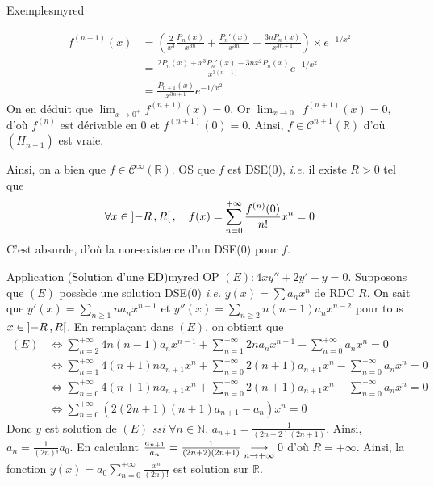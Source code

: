 \begin{omed}{Exemples}{myred}
\begin{enumerate}[label=\textcolor{myred}{\alph*.}]
\begin{itemize}
\begin{align*}
                    f^{(n+1)}(x) 
                    &= \left(\frac{2}{x^3} \frac{P_n(x)}{x^{3n}} + \frac{P_n'(x)}{x^{3n}} - \frac{3n P_n(x)}{x^{3n + 1}}\right)\times e^{-1/x^2} \\
                    &= \frac{2 P_n(x) + x^3 P_n'(x) - 3n x^2 P_n(x)}{x^{3(n+1)}} e^{-1/x^2} \\
                    &= \frac{P_{n+1}(x)}{x^{3n+1}} e^{-1/x^2}
                \end{align*}
                On en déduit que $\lim_{x \to 0^+} f^{(n+1)}(x) = 0$. Or $\lim_{x \to 0^-} f^{(n+1)}(x) = 0$, d’où $f^{(n)}$ est dérivable en $0$ et $f^{(n+1)}(0) = 0$. Ainsi, $f \in \mathcal{C}^{n+1}(\mathbb{R})$ d’où $(H_{n+1})$ est vraie.
            \end{itemize}
            Ainsi, on a bien que $f \in \mathcal{C}^{\infty}(\mathbb{R})$. OS que $f$ est DSE(0), \textit{i.e.} il existe $R > 0$ tel que 
            \[ \forall x \in \left] -R \, , R \right[, \quad f(x) = \sum_{n=0}^{+\infty} \frac{f^{(n)}(0)}{n!} x^n = 0 \]   
            C’est absurde, d’où la non-existence d’un DSE(0) pour $f$.
        \end{enumerate}
    \end{omed}

    \begin{omed}{Application (\textcolor{black}{Solution d’une ED})}{myred}
        OP $(E) : 4x y'' + 2 y' - y = 0$. Supposons que $(E)$ possède une solution DSE(0) \textit{i.e.} $y(x) = \sum a_n x^n$ de RDC $R$. On sait que $y'(x) = \sum_{n \geq 1} n a_n x^{n-1}$ et $y''(x) = \sum_{n \geq 2} n(n-1) a_n x^{n-2}$ pour tous $x \in \left] -R \, , R \right[$. En remplaçant dans $(E)$, on obtient que 
        \begin{align*}
            (E) 
            & \iff \sum_{n=2}^{+\infty} 4n(n-1) a_n x^{n-1} + \sum_{n=1}^{+\infty} 2 n a_n x^{n-1}  - \sum_{n=0}^{+\infty} a_n x^n = 0 \\
            & \iff \sum_{n=1}^{+\infty} 4 (n+1) n a_{n+1} x^n + \sum_{n=0}^{+\infty} 2 (n+1) a_{n+1} x^n - \sum_{n=0}^{+\infty} a_n x^n = 0 \\
            & \iff \sum_{n = 0}^{+\infty } 4 (n+1) n a_{n+1} x^n + \sum_{n=0}^{+\infty} 2 (n+1) a_{n+1} x^n - \sum_{n=0}^{+\infty} a_n x^n = 0 \\
            & \iff \sum_{n=0}^{+\infty} \left(2(2n+1)(n+1) a_{n+1} - a_n\right)x^n = 0 
        \end{align*}
        Donc $y$ est solution de $(E)$ \textit{ssi} $\forall n \in \mathbb{N}$, $a_{n+1} = \frac{1}{(2n+2)(2n+1)}$. Ainsi, $a_n = \frac{1}{(2n)!} a_0$. En calculant $\frac{a_{n+1}}{a_n} = \frac{1}{(2n+2)(2n+1)} \underset{n \rightarrow +\infty}{\longrightarrow} 0$ d’où $R = +\infty$. Ainsi, la fonction $y(x) = a_0 \sum_{n=0}^{+\infty} \frac{x^n}{(2n)!}$ est solution sur $\mathbb{R}$.
    \end{omed}

